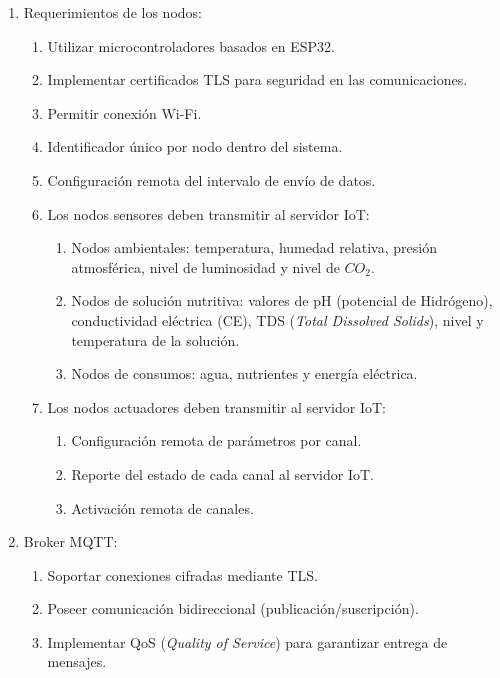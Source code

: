 \begin{enumerate}
      \item Requerimientos de los nodos:
            \begin{enumerate}
                  \item Utilizar microcontroladores basados en ESP32.
                  \item Implementar certificados TLS para seguridad en las comunicaciones.
                  \item Permitir conexión Wi-Fi.
                  \item Identificador único por nodo dentro del sistema.
                  \item Configuración remota del intervalo de envío de datos.
                  \item Los nodos sensores deben transmitir al servidor IoT:
                        \begin{enumerate}
                              \item Nodos ambientales: temperatura, humedad relativa, presión atmosférica, nivel de
                                    luminosidad y nivel de $CO_2$.
                              \item Nodos de solución nutritiva: valores de pH (potencial de Hidrógeno),
                                    conductividad eléctrica (CE), TDS (\textit{Total Dissolved Solids}), nivel y
                                    temperatura de la solución.
                              \item Nodos de consumos: agua, nutrientes y energía eléctrica.
                        \end{enumerate}
                  \item Los nodos actuadores deben transmitir al servidor IoT:
                        \begin{enumerate}
                              \item Configuración remota de parámetros por canal.
                              \item Reporte del estado de cada canal al servidor IoT.
                              \item Activación remota de canales.
                        \end{enumerate}
            \end{enumerate}

      \item Broker MQTT:
            \begin{enumerate}
                  \item Soportar conexiones cifradas mediante TLS.
                  \item Poseer comunicación bidireccional (publicación/suscripción).
                  \item Implementar QoS (\textit{Quality of Service}) para garantizar entrega de
                        mensajes.
            \end{enumerate}


\end{enumerate}
